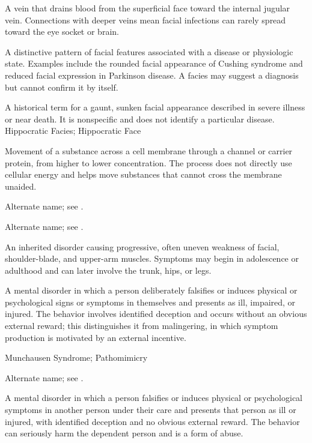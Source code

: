  A vein that drains blood from the superficial face toward the internal jugular vein. Connections with deeper veins mean facial infections can rarely spread toward the eye socket or brain.

 A distinctive pattern of facial features associated with a disease or physiologic state. Examples include the rounded facial appearance of Cushing syndrome and reduced facial expression in Parkinson disease. A facies may suggest a diagnosis but cannot confirm it by itself.

 A historical term for a gaunt, sunken facial appearance described in severe illness or near death. It is nonspecific and does not identify a particular disease.
\synonyms
Hippocratic Facies; Hippocratic Face

 Movement of a substance across a cell membrane through a channel or carrier protein, from higher to lower concentration. The process does not directly use cellular energy and helps move substances that cannot cross the membrane unaided.

 Alternate name; see .

 Alternate name; see .

 An inherited disorder causing progressive, often uneven weakness of facial, shoulder-blade, and upper-arm muscles. Symptoms may begin in adolescence or adulthood and can later involve the trunk, hips, or legs.

 A mental disorder in which a person deliberately falsifies or induces physical or psychological signs or symptoms in themselves and presents as ill, impaired, or injured. The behavior involves identified deception and occurs without an obvious external reward; this distinguishes it from malingering, in which symptom production is motivated by an external incentive.

\synonyms
Munchausen Syndrome; Pathomimicry

 Alternate name; see .

 A mental disorder in which a person falsifies or induces physical or psychological symptoms in another person under their care and presents that person as ill or injured, with identified deception and no obvious external reward. The behavior can seriously harm the dependent person and is a form of abuse.

